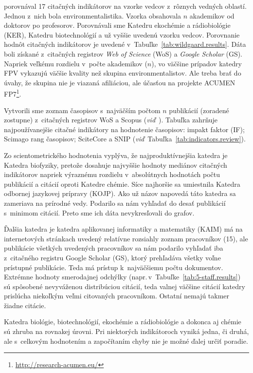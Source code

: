 \citet{Wildgaard2015} porovnával 17 citačných indikátorov na vzorke vedcov
z~rôznych vedných oblastí.  Jednou z~nich bola environmentalistika.  Vzorka
obsahovala $n$ akademikov od doktorov po profesorov.  Porovnávali sme Katedru
ekochémie a rádiobiológie (KER), Katedru biotechnológií a už vyššie uvedenú
vzorku vedcov.  Porovnanie hodnôt citačných indikátorov je uvedené
v~Tabuľke~\ref{tab:wildgaard.results}.  Dáta boli získané z~citačných registrov
\emph{Web of Science} (WoS) a \emph{Google Scholar} (GS).  Napriek veľkému
rozdielu v~počte akademikov ($n$), vo väčšine prípadov katedry FPV vykazujú
väčšie kvality než skupina environmentalistov.  Ale treba brať do úvahy, že
skupina nie je viazaná afiliáciou, ale účasťou na projekte ACUMEN
FP7\footnote{\url{http://research-acumen.eu/}}.

Vytvorili sme zoznam časopisov s~najväčším počtom $n$ publikácií (zoradené
zostupne) z~citačných registrov WoS a Scopus
(\emph{viď}~).  Tabuľka zahrňuje najpoužívanejšie citačné
indikátory na hodnotenie časopisov: impakt faktor (IF); Scimago rang časopisov;
SciteCore a SNIP (\emph{viď}~Tabuľka~\ref{tab:indicators.review}).

Zo scientometrického hodnotenia vyplýva, že najproduktívnejšia katedra je
Katedra biofyziky, pretože dosahuje najvyššie hodnoty mediánov citačných
indikátorov napriek výraznému rozdielu v~absolútnych hodnotách počtu publikácií
a citácií oproti Katedre chémie.  Síce najhoršie sa umiestnila Katedra odbornej
jazykovej prípravy (KOJP).  Ako už názov napovedá táto katedra sa zameriava na
prírodné vedy.  Podarilo sa nám vyhľadať do desať publikácií s~minimom citácií.
Preto sme ich dáta nevykresľovali do grafov.

Ďalšia katedra je katedra aplikovanej informatiky a matematiky (KAIM) má na
internetových stránkach uvedený relatívne rozsiahly zoznam pracovníkov (15), ale
publikácie všetkých uvedených pracovníkov sa nám podarilo vyhľadať iba
z~citačného registru Google Scholar (GS), ktorý prehľadáva všetky voľne
prístupné publikácie.  Teda má prístup k~najväčšiemu počtu dokumentov.  Extrémne
hodnoty smerodajnej odchýlky (napr.\,v~Tabuľke~\ref{tab:5-staff.results}) sú
spôsobené nevyváženou distribúciou citácií, teda valnej väčšine citácií katedry
prislúcha niekoľkým veľmi citovaných pracovníkom.  Ostatní nemajú takmer žiadne
citácie.

Katedra biológie, biotechnológií, ekochémie a rádiobiológie a dokonca aj chémie
sú zhruba na rovnakej úrovni.  Pri niektorých indikátoroch vyniká jedna, či
druhá, ale s~celkovým hodnotením a započítaním chyby nie je možné ďalej určiť
poradie.

